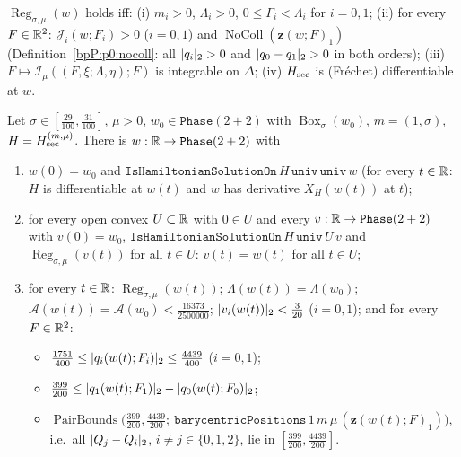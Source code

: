 \begin{definition}\label{bpP:p14:sb-regular}
$\operatorname{Reg}_{\sigma,\mu}(w)$ holds iff: (i) $m_i>0$, $\Lambda_i>0$, $0\le\Gamma_i<\Lambda_i$ for $i=0,1$; (ii) for every $F\in\mathbb{R}^2$: $\mathcal J_i(w;F_i)>0$ ($i=0,1$) and $\operatorname{NoColl}(\mathbf z(w;F)_1)$ (Definition~\ref{bpP:p0:nocoll}: all $\lvert q_i\rvert_2>0$ and $\lvert q_0-q_1\rvert_2>0$ in both orders);
(iii) $F\mapsto\mathcal I_\mu((F,\xi;\Lambda,\eta);F)$ is integrable on $\Delta$; (iv) $H_{\rm sec}$ is (Fr\'echet) differentiable at $w$.
\end{definition}

\begin{theorem}\label{bpP:p14:sb-safety}
Let $\sigma\in[\frac{29}{100},\frac{31}{100}]$, $\mu>0$, $w_0\in\texttt{Phase}(2+2)$ with $\operatorname{Box}_\sigma(w_0)$, $m=(1,\sigma)$, $H=H_{\rm sec}^{(m,\mu)}$. There is $w:\mathbb{R}\to\texttt{Phase}(2+2)$ with
\begin{enumerate}[label=(\alph*)]
\item $w(0)=w_0$ and $\texttt{IsHamiltonianSolutionOn}\,H\,\texttt{univ}\,\texttt{univ}\,w$ (for every $t\in\mathbb{R}$: $H$ is differentiable at $w(t)$ and $w$ has derivative $X_H(w(t))$ at $t$);
\item for every open convex $U\subset\mathbb{R}$ with $0\in U$ and every $v:\mathbb{R}\to\texttt{Phase}(2+2)$ with $v(0)=w_0$, $\texttt{IsHamiltonianSolutionOn}\,H\,\texttt{univ}\,U\,v$ and $\operatorname{Reg}_{\sigma,\mu}(v(t))$ for all $t\in U$: $v(t)=w(t)$ for all $t\in U$;
\item for every $t\in\mathbb{R}$: $\operatorname{Reg}_{\sigma,\mu}(w(t))$; $\Lambda(w(t))=\Lambda(w_0)$; $\mathcal A(w(t))=\mathcal A(w_0)<\frac{16373}{2500000}$; $\lvert v_i(w(t))\rvert_2<\frac3{20}$ ($i=0,1$); and for every $F\in\mathbb{R}^2$:
\begin{itemize}
\item $\frac{1751}{400}\le\lvert q_i(w(t);F_i)\rvert_2\le\frac{4439}{400}$ ($i=0,1$);
\item $\frac{399}{200}\le\lvert q_1(w(t);F_1)\rvert_2-\lvert q_0(w(t);F_0)\rvert_2$;
\item $\operatorname{PairBounds}\bigl(\frac{399}{200},\frac{4439}{200};\ \texttt{barycentricPositions}\,1\,m\,\mu\,(\mathbf z(w(t);F)_1)\bigr)$, i.e.\ all $\lvert Q_j-Q_i\rvert_2$, $i\ne j\in\{0,1,2\}$, lie in $[\frac{399}{200},\frac{4439}{200}]$.
\end{itemize}
\end{enumerate}
\end{theorem}

